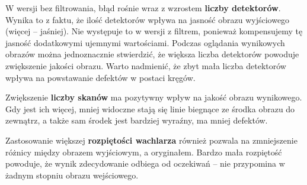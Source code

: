 \documentclass[polish,polish,a4paper]{article}
\begin{document}
		W wersji bez filtrowania, błąd rośnie wraz z wzrostem \textbf{liczby detektorów}.
		Wynika to z faktu, że ilość detektorów wpływa na jasność obrazu wyjściowego (więcej -- jaśniej).
		 Nie występuje to w wersji z filtrem,
		  ponieważ kompensujemy tę jasność dodatkowymi ujemnymi wartościami.
		 Podczas oglądania wynikowych obrazów można jednoznacznie stwierdzić, 
		 że większa liczba detektorów powoduje zwiększenie jakości obrazu.
		 Warto nadmienić, że zbyt mała liczba detektorów wpływa na powstawanie defektów w postaci kręgów. 
		
		
		Zwiększenie \textbf{liczby skanów} ma pozytywny wpływ na jakość obrazu wynikowego.
		Gdy jest ich więcej, mniej widoczne stają się linie biegnące ze środka obrazu do zewnątrz, a także sam środek jest bardziej wyraźny, ma mniej defektów.
		
		Zastosowanie większej \textbf{rozpiętości wachlarza} również pozwala na zmniejszenie różnicy między obrazem wyjściowym, a oryginałem.
		Bardzo mała rozpiętość powoduje, że wynik zdecydowanie odbiega od oczekiwań -- nie przypomina w żadnym stopniu obrazu wejściowego.
		
		\newpage
\end{document}
